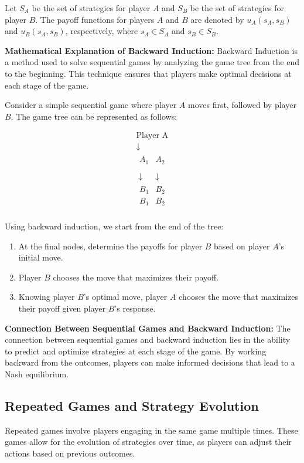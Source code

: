 \documentclass[12pt]{book} %
\begin{document}
Let $S_A$ be the set of strategies for player $A$ and $S_B$ be the set of strategies for player $B$. The payoff functions for players $A$ and $B$ are denoted by $u_A(s_A, s_B)$ and $u_B(s_A, s_B)$, respectively, where $s_A \in S_A$ and $s_B \in S_B$.

\textbf{Mathematical Explanation of Backward Induction:}
Backward Induction is a method used to solve sequential games by analyzing the game tree from the end to the beginning. This technique ensures that players make optimal decisions at each stage of the game.

Consider a simple sequential game where player $A$ moves first, followed by player $B$. The game tree can be represented as follows:

\[
\begin{array}{c}
\text{Player A} \\
\downarrow \\
\begin{array}{c|c}
A_1 & A_2 \\
\end{array} \\
\downarrow \quad \downarrow \\
\begin{array}{cc}
B_1 & B_2 \\
B_1 & B_2 \\
\end{array}
\end{array}
\]

Using backward induction, we start from the end of the tree:
\begin{enumerate}
    \item At the final nodes, determine the payoffs for player $B$ based on player $A$'s initial move.
    \item Player $B$ chooses the move that maximizes their payoff.
    \item Knowing player $B$'s optimal move, player $A$ chooses the move that maximizes their payoff given player $B$'s response.
\end{enumerate}

\textbf{Connection Between Sequential Games and Backward Induction:}
The connection between sequential games and backward induction lies in the ability to predict and optimize strategies at each stage of the game. By working backward from the outcomes, players can make informed decisions that lead to a Nash equilibrium.

\subsection{Repeated Games and Strategy Evolution}
Repeated games involve players engaging in the same game multiple times. These games allow for the evolution of strategies over time, as players can adjust their actions based on previous outcomes.
\end{document}
